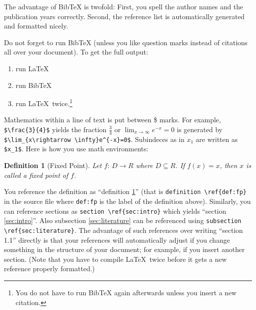 \documentclass[12pt,a4paper]{article}
\makeatletter
\newtheorem{definition}{Definition}
\renewcommand{\section}{\@startsection{section}{1}{0mm}{-1.5\baselineskip}{0.8\baselineskip}{\normalfont\large\centering}}
\renewcommand{\section}{\@startsection{section}{1}{0mm}{-0.9\baselineskip}{0.5\baselineskip}{\normalfont\large\centering}}
\makeatother
\begin{document}
The advantage of BibTeX is twofold: First, you spell the author names and the publication years correctly. Second, the reference list is automatically generated and formatted nicely.

Do not forget to run BibTeX (unless you like question marks instead of citations all over your document). To get the full output:

\begin{enumerate}
\item run \LaTeX
\item run BibTeX
\item run \LaTeX\ twice.\footnote{You do not have to run BibTeX again afterwards unless you insert a new citation.}
\end{enumerate}

\section{Maths}\label{sec:math}

Mathematics within a line of text is put between \$ marks. For example, \verb|$\frac{3}{4}$| yields the fraction $\frac{3}{4}$ or $\lim_{x\rightarrow \infty}e^{-x}=0$ is generated by\\ %
\verb|$\lim_{x\rightarrow \infty}e^{-x}=0$|. Subindeces as in $x_1$ are written as \verb|$x_1$|. Here is how you use math environments:

\begin{definition}[Fixed Point]\label{def:fp}
  Let $f: \,D\rightarrow R$ where $D\subseteq R$. If $f(x)=x$, then $x$ is called a \emph{fixed point} of $f$.
\end{definition}

You reference the definition as ``definition \ref{def:fp}'' (that is \verb|definition \ref{def:fp}| in the source file where \verb|def:fp| is the label of the definition above). Similarly, you can reference sections as \verb|section \ref{sec:intro}| which yields ``section \ref{sec:intro}''. Also subsection \ref{sec:literature} can be referenced using \verb|subsection \ref{sec:literature}|. The advantage of such references over writing ``section 1.1'' directly is that your references will automatically adjust if you change something in the structure of your document; for example, if you insert another section.
(Note that you have to compile \LaTeX\ twice before it gets a new reference properly formatted.)
\end{document}
